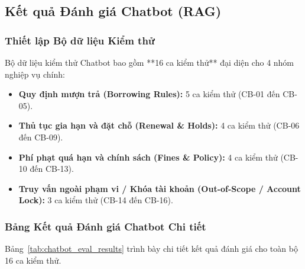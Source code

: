 \subsection{Kết quả Đánh giá Chatbot (RAG)}

\subsubsection{Thiết lập Bộ dữ liệu Kiểm thử}

Bộ dữ liệu kiểm thử Chatbot bao gồm **16 ca kiểm thử** đại diện cho 4 nhóm nghiệp vụ chính:
\begin{itemize}
    \item \textbf{Quy định mượn trả (Borrowing Rules):} 5 ca kiểm thử (CB-01 đến CB-05).
    \item \textbf{Thủ tục gia hạn và đặt chỗ (Renewal \& Holds):} 4 ca kiểm thử (CB-06 đến CB-09).
    \item \textbf{Phí phạt quá hạn và chính sách (Fines \& Policy):} 4 ca kiểm thử (CB-10 đến CB-13).
    \item \textbf{Truy vấn ngoài phạm vi / Khóa tài khoản (Out-of-Scope / Account Lock):} 3 ca kiểm thử (CB-14 đến CB-16).
\end{itemize}

\subsubsection{Bảng Kết quả Đánh giá Chatbot Chi tiết}

Bảng~\ref{tab:chatbot_eval_results} trình bày chi tiết kết quả đánh giá cho toàn bộ 16 ca kiểm thử.

